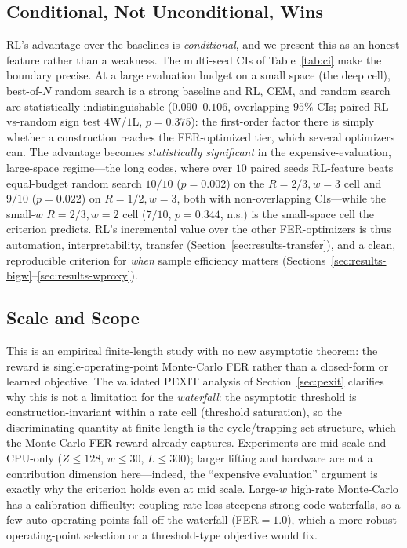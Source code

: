 \documentclass[journal]{IEEEtran}
\begin{document}
\subsection{Conditional, Not Unconditional, Wins}
RL's advantage over the baselines is \emph{conditional}, and we present this as
an honest feature rather than a weakness. The multi-seed CIs of
Table~\ref{tab:ci} make the boundary precise. At a large evaluation budget on a
small space (the deep cell), best-of-$N$ random search is a strong baseline and
RL, CEM, and random search are statistically indistinguishable ($0.090$--$0.106$,
overlapping $95\%$ CIs; paired RL-vs-random sign test $4$W/$1$L, $p{=}0.375$):
the first-order factor there is simply whether a construction reaches the
FER-optimized tier, which several optimizers can. The advantage becomes
\emph{statistically significant} in the expensive-evaluation, large-space
regime---the long codes, where over $10$ paired seeds RL-feature beats
equal-budget random search $10/10$ ($p{=}0.002$) on the $R{=}2/3,w{=}3$ cell and
$9/10$ ($p{=}0.022$) on $R{=}1/2,w{=}3$, both with non-overlapping CIs---while the
small-$w$ $R{=}2/3,w{=}2$ cell ($7/10$, $p{=}0.344$, n.s.) is the small-space cell
the criterion predicts. RL's incremental value over the other
FER-optimizers is thus automation, interpretability, transfer
(Section~\ref{sec:results-transfer}), and a clean, reproducible criterion for
\emph{when} sample efficiency matters
(Sections~\ref{sec:results-bigw}--\ref{sec:results-wproxy}).

\subsection{Scale and Scope}
This is an empirical finite-length study with no new asymptotic theorem: the
reward is single-operating-point Monte-Carlo FER rather than a closed-form or
learned objective. The validated PEXIT analysis of Section~\ref{sec:pexit}
clarifies why this is not a limitation for the \emph{waterfall}: the asymptotic
threshold is construction-invariant within a rate cell (threshold saturation),
so the discriminating quantity at finite length is the cycle/trapping-set
structure, which the Monte-Carlo FER reward already captures. Experiments are
mid-scale and CPU-only
($Z\le128$, $w\le30$, $L\le300$); larger lifting and hardware are not a
contribution dimension here---indeed, the ``expensive evaluation'' argument is
exactly why the criterion holds even at mid scale. Large-$w$ high-rate Monte-Carlo
has a calibration difficulty: coupling rate loss steepens strong-code waterfalls,
so a few auto operating points fall off the waterfall (FER$=1.0$), which a more
robust operating-point selection or a threshold-type objective would fix.
\end{document}
